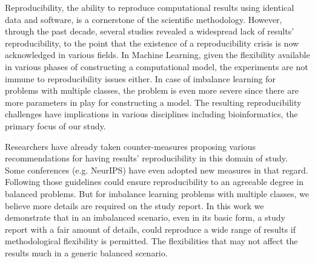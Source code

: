 Reproducibility, the ability to reproduce computational results using identical data and software, 
is a cornerstone of the scientific methodology. However, through the past decade, several studies 
revealed a widespread lack of results’ reproducibility, to the point that the existence of a 
reproducibility crisis is now acknowledged in various fields.
In Machine Learning, given the flexibility available in various phases of constructing a 
computational model, the experiments are not immune to reproducibility issues either. 
In case of imbalance learning for problems with multiple classes, the problem is even more 
severe since there are more parameters in play for constructing a model. 
The resulting reproducibility challenges have implications in various disciplines 
including bioinformatics, the primary focus of our study.


Researchers have already taken counter-measures proposing various recommendations for having results’ 
reproducibility in this domain of study. Some conferences (e.g. NeurIPS) have even adopted 
new measures in that regard. Following those guidelines could ensure reproducibility  
to an agreeable degree in balanced problems. But for imbalance learning problems with 
multiple classes, we believe more details are required on the study report.
In this work we demonstrate that in an imbalanced scenario, even in its basic form, 
a study report with a fair amount of details, could reproduce a wide range of results if 
methodological flexibility is permitted. The flexibilities that may not affect the results 
much in a generic balanced scenario.